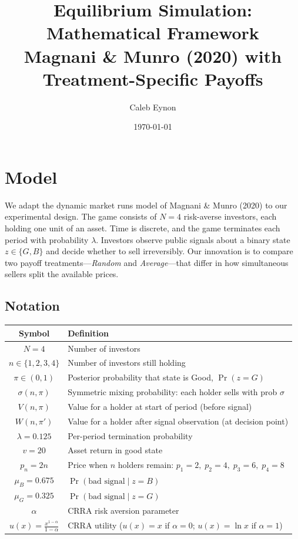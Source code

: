 \documentclass[11pt]{article}
\title{Equilibrium Simulation: Mathematical Framework\\
{\large Magnani \& Munro (2020) with Treatment-Specific Payoffs}}
\author{Caleb Eynon}
\date{\today}
\begin{document}
\maketitle

\section{Model}

We adapt the dynamic market runs model of Magnani \& Munro (2020) to our
experimental design. The game consists of $N = 4$ risk-averse investors, each
holding one unit of an asset. Time is discrete, and the game terminates each
period with probability $\lambda$. Investors observe public signals about a
binary state $z \in \{G, B\}$ and decide whether to sell irreversibly. Our
innovation is to compare two payoff treatments---\textit{Random} and
\textit{Average}---that differ in how simultaneous sellers split the available
prices.

\subsection{Notation}

\begin{table}[h]
\centering
\begin{tabular}{cl}
\toprule
Symbol & Definition \\
\midrule
$N = 4$ & Number of investors \\
$n \in \{1,2,3,4\}$ & Number of investors still holding \\
$\pi \in (0,1)$ & Posterior probability that state is Good, $\Pr(z = G)$ \\
$\sigma(n,\pi)$ & Symmetric mixing probability: each holder sells with prob $\sigma$ \\
$V(n,\pi)$ & Value for a holder at start of period (before signal) \\
$W(n,\pi')$ & Value for a holder after signal observation (at decision point) \\
$\lambda = 0.125$ & Per-period termination probability \\
$v = 20$ & Asset return in good state \\
$p_n = 2n$ & Price when $n$ holders remain: $p_1 = 2,\; p_2 = 4,\; p_3 = 6,\; p_4 = 8$ \\
$\mu_B = 0.675$ & $\Pr(\text{bad signal} \mid z = B)$ \\
$\mu_G = 0.325$ & $\Pr(\text{bad signal} \mid z = G)$ \\
$\alpha$ & CRRA risk aversion parameter \\
$u(x) = \frac{x^{1-\alpha}}{1-\alpha}$ & CRRA utility ($u(x) = x$ if $\alpha = 0$; $u(x) = \ln x$ if $\alpha = 1$) \\
\bottomrule
\end{tabular}
\end{table}
\end{document}
